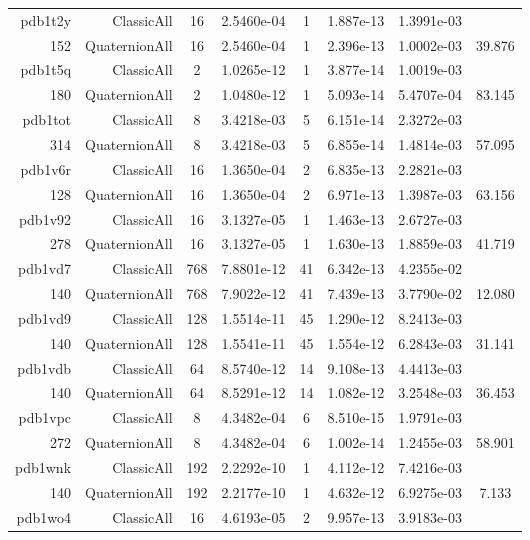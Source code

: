 \begin{xltabular}{\textwidth}{r|rcS[table-format=1.4e+2]cS[table-format=1.3e+2]S[table-format=1.4e+2]S[table-format=-1.3]}
pdb1t2y & ClassicAll & 16 & 2.5460e-04 & 1 & 1.887e-13 & 1.3991e-03 & \\
152 & QuaternionAll & 16 & 2.5460e-04 & 1 & 2.396e-13 & 1.0002e-03 & 39.876\\  \addlinespace
pdb1t5q & ClassicAll & 2 & 1.0265e-12 & 1 & 3.877e-14 & 1.0019e-03 & \\
180 & QuaternionAll & 2 & 1.0480e-12 & 1 & 5.093e-14 & 5.4707e-04 & 83.145\\  \addlinespace
pdb1tot & ClassicAll & 8 & 3.4218e-03 & 5 & 6.151e-14 & 2.3272e-03 & \\
314 & QuaternionAll & 8 & 3.4218e-03 & 5 & 6.855e-14 & 1.4814e-03 & 57.095\\  \addlinespace
pdb1v6r & ClassicAll & 16 & 1.3650e-04 & 2 & 6.835e-13 & 2.2821e-03 & \\
128 & QuaternionAll & 16 & 1.3650e-04 & 2 & 6.971e-13 & 1.3987e-03 & 63.156\\  \addlinespace
pdb1v92 & ClassicAll & 16 & 3.1327e-05 & 1 & 1.463e-13 & 2.6727e-03 & \\
278 & QuaternionAll & 16 & 3.1327e-05 & 1 & 1.630e-13 & 1.8859e-03 & 41.719\\  \addlinespace
pdb1vd7 & ClassicAll & 768 & 7.8801e-12 & 41 & 6.342e-13 & 4.2355e-02 & \\
140 & QuaternionAll & 768 & 7.9022e-12 & 41 & 7.439e-13 & 3.7790e-02 & 12.080\\  \addlinespace
pdb1vd9 & ClassicAll & 128 & 1.5514e-11 & 45 & 1.290e-12 & 8.2413e-03 & \\
140 & QuaternionAll & 128 & 1.5541e-11 & 45 & 1.554e-12 & 6.2843e-03 & 31.141\\  \addlinespace
pdb1vdb & ClassicAll & 64 & 8.5740e-12 & 14 & 9.108e-13 & 4.4413e-03 & \\
140 & QuaternionAll & 64 & 8.5291e-12 & 14 & 1.082e-12 & 3.2548e-03 & 36.453\\  \addlinespace
pdb1vpc & ClassicAll & 8 & 4.3482e-04 & 6 & 8.510e-15 & 1.9791e-03 & \\
272 & QuaternionAll & 8 & 4.3482e-04 & 6 & 1.002e-14 & 1.2455e-03 & 58.901\\  \addlinespace
pdb1wnk & ClassicAll & 192 & 2.2292e-10 & 1 & 4.112e-12 & 7.4216e-03 & \\
140 & QuaternionAll & 192 & 2.2177e-10 & 1 & 4.632e-12 & 6.9275e-03 & 7.133\\  \addlinespace
pdb1wo4 & ClassicAll & 16 & 4.6193e-05 & 2 & 9.957e-13 & 3.9183e-03 & \\

\end{xltabular}
